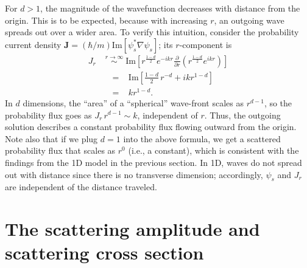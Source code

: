 \documentclass[pra,12pt]{revtex4}
\begin{document}
For $d > 1$, the magnitude of the wavefunction decreases with distance
from the origin.  This is to be expected, because with increasing $r$,
an outgoing wave spreads out over a wider area.  To verify this
intuition, consider the probability current density
$\mathbf{J} = (\hbar/m) \mathrm{Im}\left[\psi_s^*\nabla\psi_s\right]$;
its $r$-component is
$$\begin{aligned}J_r \; &\overset{r\rightarrow\infty}{\sim} \; \mathrm{Im}\left[r^{\frac{1-d}{2}} e^{-ikr} \frac{\partial}{\partial r}\left(r^{\frac{1-d}{2}} e^{ikr}\right)\right] \\ &\;\;=\;\;\;\mathrm{Im}\left[\frac{1-d}{2}\, r^{-d} + ik r^{1-d}\right]\\ &\;\;=\;\;\; kr^{1-d}.\end{aligned}$$
In $d$ dimensions, the ``area'' of a ``spherical'' wave-front scales
as $r^{d-1}$, so the probability flux goes as $J_r \,r^{d-1} \sim k$,
independent of $r$.  Thus, the outgoing solution describes a constant
probability flux flowing outward from the origin.  Note also that if
we plug $d=1$ into the above formula, we get a scattered probability
flux that scales as $r^0$ (i.e., a constant), which is consistent
with the findings from the 1D model in the previous section.
In 1D, waves do not spread out with distance since there is no
transverse dimension; accordingly, $\psi_s$ and $J_r$ are independent
of the distance traveled.

\section{The scattering amplitude and scattering cross section}
\end{document}
